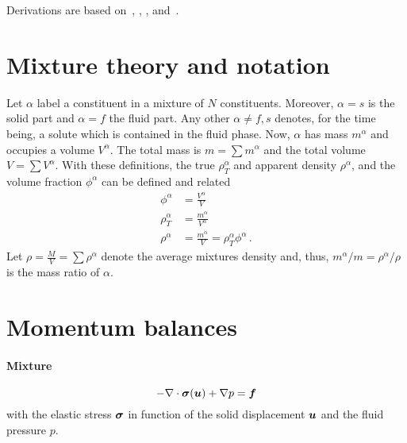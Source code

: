 \documentclass[a4paper,DIV=12,10pt]{scrartcl}
\newcommand{\U}[0]{\vek{u}}
\begin{document}


Derivations are based on~\cite{ateshian2006mixture}, \cite{zhang2007effect},
\cite{boonkkamp}, 
and~\cite{bowen1980incompressible}.

\section{Mixture theory and notation}
\label{sec:mixture}
Let $\alpha$ label a constituent in a mixture of $N$ constituents. Moreover,
$\alpha = s$ is the solid part and $\alpha = f$ the fluid part. Any other
$\alpha \neq f, s$ denotes, for the time being, a solute which is contained in
the fluid phase.
Now, $\alpha$ has mass $m^\alpha$ and occupies a volume $V^\alpha$.  The total
mass is $m = \sum m^\alpha$ and the total volume $V = \sum V^\alpha$. With
these definitions, the true $\rho^\alpha_T$ and apparent density
$\rho^\alpha$, and the volume fraction $\phi^\alpha$ can be defined and
related 
\begin{equation}
  \label{eq:density}
  \begin{aligned}
    \phi^\alpha   &= \frac{V^\alpha}{V} \\
    \rho^\alpha_T &= \frac{m^\alpha}{V^\alpha} \\
    \rho^\alpha   &= \frac{m^\alpha}{V} = \rho^\alpha_T \phi^\alpha\,.
  \end{aligned}
\end{equation}
Let $\rho = \frac{M}{V} = \sum \rho^\alpha$ denote the average mixtures
density and, thus, $m^\alpha / m = \rho^\alpha / \rho$ is the mass ratio of
$\alpha$.

\section{Momentum balances}
\label{sec:momentum}

\paragraph{Mixture}
\begin{equation}
  \label{eq:momMix}
  -\nabla \cdot \vek{\sigma}(\U) + \nabla p = \vek{f}
\end{equation}
with the elastic stress $\boldsymbol{\sigma}$ in function of the solid displacement
$\U$ and the fluid pressure $p$.
\end{document}
